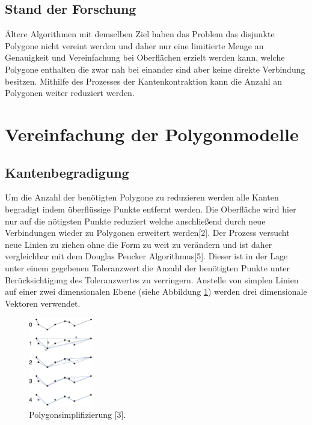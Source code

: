 \documentclass[runningheads]{llncs}
\begin{document}
    \subsection{Stand der Forschung}
        Ältere Algorithmen mit demselben Ziel haben das Problem das disjunkte Polygone nicht vereint werden und daher nur eine limitierte Menge an Genauigkeit und Vereinfachung bei Oberflächen erzielt werden kann, welche Polygone enthalten die zwar nah bei einander sind aber keine direkte Verbindung besitzen. Mithilfe des Prozesses der Kantenkontraktion kann die Anzahl an Polygonen weiter reduziert werden.

\section{Vereinfachung der Polygonmodelle}

    \subsection{Kantenbegradigung}
    Um die Anzahl der benötigten Polygone zu reduzieren werden alle Kanten begradigt indem überflüssige Punkte entfernt werden. 
    Die Oberfläche wird hier nur auf die nötigsten Punkte reduziert welche anschließend durch neue Verbindungen wieder zu Polygonen erweitert werden[2].\newline
    Der Prozess versucht neue Linien zu ziehen ohne die Form zu weit zu verändern und ist daher vergleichbar mit dem Douglas Peucker Algorithmus[5]. 
    Dieser ist in der Lage unter einem gegebenen Toleranzwert die Anzahl der benötigten Punkte unter Berücksichtigung des Toleranzwertes zu verringern.
    Anstelle von simplen Linien auf einer zwei dimensionalen Ebene (siehe Abbildung \ref{fig:Polygonsimplifizierung}) werden drei dimensionale Vektoren verwendet.\newline
    
    \begin{figure}[ht]
	\centering
	\includegraphics[width=0.25\textwidth]{Polygonsimplifizierung.png}
	\caption{Polygonsimplifizierung [3].}
	\label{fig:Polygonsimplifizierung}
\end{figure}
\end{document}
